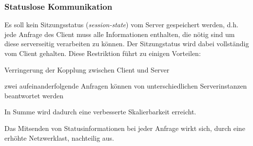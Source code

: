\subsubsection{Statuslose Kommunikation}
\label{sec:stateless_communication}

Es soll kein Sitzungsstatus (\emph{session-state}) vom Server gespeichert werden, d.h. jede Anfrage des Client muss alle Informationen enthalten, die nötig sind um diese serverseitig verarbeiten zu können. Der Sitzungstatus wird dabei vollständig vom Client gehalten. 
Diese Restriktion führt zu einigen Vorteilen:
\begin{compactitem}
    \item Verringerung der Kopplung zwischen Client und Server
    \item zwei aufeinanderfolgende Anfragen können von unterschiedlichen Serverinstanzen beantwortet werden
\end{compactitem}
In Summe wird dadurch eine verbesserte Skalierbarkeit erreicht.

Das Mitsenden von Statusinformationen bei jeder Anfrage wirkt sich, durch eine erhöhte Netzwerklast, nachteilig aus.
